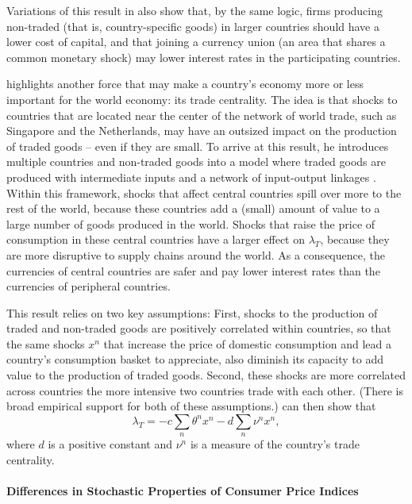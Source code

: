 \documentclass{ar-1col}
\begin{document}
Variations of this result in \citet{Hassan2013} also show that, by the same logic, firms producing non-traded (that is, country-specific goods) in larger countries should have a lower cost of capital, and that joining a currency union (an area that shares a common monetary shock) may lower interest rates in the participating countries.

\citet{Richmond2019} highlights another force that may make a country's economy more or less important for the world economy: its trade centrality. The idea is that shocks to countries that are located near the center of the network of world trade, such as Singapore and the Netherlands, may have an outsized impact on the production of traded goods -- even if they are small. To arrive at this result, he introduces multiple countries and non-traded goods into a model where traded goods are produced with intermediate inputs and a network of input-output linkages . Within this framework, shocks that affect central countries spill over more to the rest of the world, because these countries add a (small) amount of value to a large number of goods produced in the world. Shocks that raise the price of consumption in these central countries have a larger effect on  $\lambda_T$, because they are more disruptive to supply chains around the world. As a consequence, the currencies of central countries are safer and pay lower interest rates than the currencies of peripheral countries.   

This result relies on two key assumptions: First, shocks to the production of traded and non-traded goods are positively correlated within countries, so that the same shocks $x^n$ that increase the price of domestic consumption and lead a country's consumption basket to appreciate, also diminish its capacity to add value to the production of traded goods. Second, these shocks are more correlated across countries the more intensive two countries trade with each other. (There is broad empirical support for both of these assumptions.) \citet{Richmond2019} can then show that $$\lambda_{T} = -c \sum_{n} \theta^n x^n- d\sum_{n} \nu^n x^n,$$ where $d$ is a positive constant and $\nu^n$ is a measure of the country's trade centrality.


\paragraph*{Differences in Stochastic Properties of Consumer Price Indices}
\end{document}
